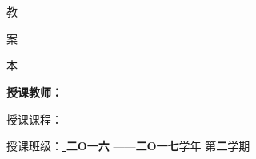 \documentclass[a4paper,12pt]{article}
\begin{document}
\begin{titlepage}

\begin{center}
{ \yihao \bf
{}  \\
 \\ }
\vfill 
{ \yihao \fangsong  \fontsize{46pt}{80pt}\selectfont
   教
\par 案
\par 本
\par }
\par
\vfill \vfill \sihao \setlength{\baselineskip}{1cm}  \bf  
 授课教师：\underline{ \makebox[5cm]{ \jsxmNR}}\par
 授课课程：\underline{ }\par
授课班级：\underline{ \makebox[5cm]{ \skbcNR}} 
\vfill
{\bf 二O一六 }——{\bf 二O一七}学年\hspace{0.5cm} 第{\bf 二}学期
\end{center}
\vfill
\end{titlepage}


\tableofcontents
\setcounter{page}{-0}
\thispagestyle{empty}

\xiaosi

%
%
%
%
%
%
%


\setcounter{section}{0}%
%
%


%
%
%
%
%
%
%
\end{document}
